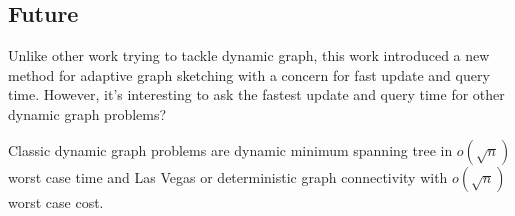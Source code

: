 \documentclass[conference,compsoc]{IEEEtran}
\begin{document}
	\subsection{Future}
		\par Unlike other work trying to tackle dynamic graph, this work introduced a new method for adaptive graph sketching with a concern for fast update and query time. 
		However, it's interesting to ask the fastest update and query time for other dynamic graph problems?
		\par Classic dynamic graph problems are dynamic minimum spanning tree in $o(\sqrt{n})$ worst case time and Las Vegas or deterministic graph connectivity with $o(\sqrt{n})$ worst case cost.



\end{document}
